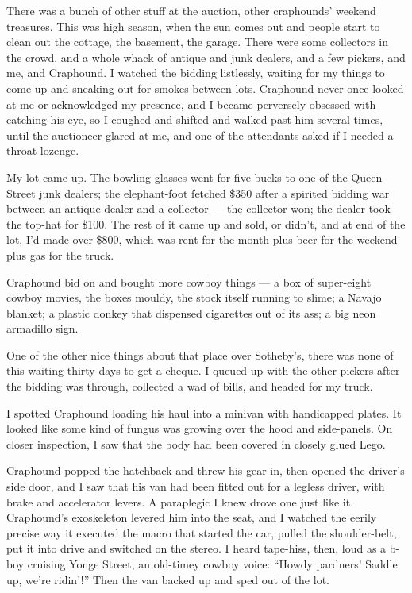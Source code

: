 There was a bunch of other stuff at the auction, other craphounds'
weekend treasures. This was high season, when the sun comes out and
people start to clean out the cottage, the basement, the garage.
There were some collectors in the crowd, and a whole whack of
antique and junk dealers, and a few pickers, and me, and Craphound.
I watched the bidding listlessly, waiting for my things to come up
and sneaking out for smokes between lots. Craphound never once
looked at me or acknowledged my presence, and I became perversely
obsessed with catching his eye, so I coughed and shifted and walked
past him several times, until the auctioneer glared at me, and one
of the attendants asked if I needed a throat lozenge.

My lot came up. The bowling glasses went for five bucks to one of
the Queen Street junk dealers; the elephant-foot fetched \$350
after a spirited bidding war between an antique dealer and a
collector --- the collector won; the dealer took the top-hat for
\$100. The rest of it came up and sold, or didn't, and at end of
the lot, I'd made over \$800, which was rent for the month plus
beer for the weekend plus gas for the truck.

Craphound bid on and bought more cowboy things --- a box of
super-eight cowboy movies, the boxes mouldy, the stock itself
running to slime; a Navajo blanket; a plastic donkey that dispensed
cigarettes out of its ass; a big neon armadillo sign.

One of the other nice things about that place over Sotheby's, there
was none of this waiting thirty days to get a cheque. I queued up
with the other pickers after the bidding was through, collected a
wad of bills, and headed for my truck.

I spotted Craphound loading his haul into a minivan with
handicapped plates. It looked like some kind of fungus was growing
over the hood and side-panels. On closer inspection, I saw that the
body had been covered in closely glued Lego.

Craphound popped the hatchback and threw his gear in, then opened
the driver's side door, and I saw that his van had been fitted out
for a legless driver, with brake and accelerator levers. A
paraplegic I knew drove one just like it. Craphound's exoskeleton
levered him into the seat, and I watched the eerily precise way it
executed the macro that started the car, pulled the shoulder-belt,
put it into drive and switched on the stereo. I heard tape-hiss,
then, loud as a b-boy cruising Yonge Street, an old-timey cowboy
voice: ``Howdy pardners! Saddle up, we're ridin'!'' Then the van
backed up and sped out of the lot.

